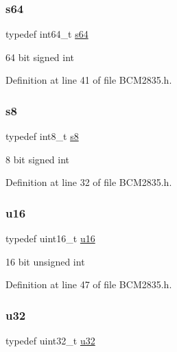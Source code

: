 \mbox{\label{group__Common_ga350c6fc928e3bdc6c6486268ac8fb269}} 
\subsubsection{\texorpdfstring{s64}{s64}}
{\footnotesize\ttfamily typedef int64\+\_\+t \hyperlink{group__Common_ga350c6fc928e3bdc6c6486268ac8fb269}{s64}}



64 bit signed int 



Definition at line 41 of file B\+C\+M2835.\+h.

\mbox{\label{group__Common_ga9e382f207c65ca13ab4ae98363aeda80}} 
\subsubsection{\texorpdfstring{s8}{s8}}
{\footnotesize\ttfamily typedef int8\+\_\+t \hyperlink{group__Common_ga9e382f207c65ca13ab4ae98363aeda80}{s8}}



8 bit signed int 



Definition at line 32 of file B\+C\+M2835.\+h.

\mbox{\label{group__Common_gace9d960e74685e2cd84b36132dbbf8aa}} 
\subsubsection{\texorpdfstring{u16}{u16}}
{\footnotesize\ttfamily typedef uint16\+\_\+t \hyperlink{group__Common_gace9d960e74685e2cd84b36132dbbf8aa}{u16}}



16 bit unsigned int 



Definition at line 47 of file B\+C\+M2835.\+h.

\mbox{\label{group__Common_gafaa62991928fb9fb18ff0db62a040aba}} 
\subsubsection{\texorpdfstring{u32}{u32}}
{\footnotesize\ttfamily typedef uint32\+\_\+t \hyperlink{group__Common_gafaa62991928fb9fb18ff0db62a040aba}{u32}}



